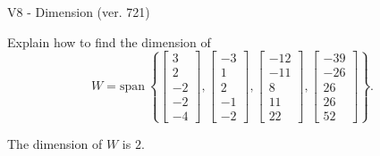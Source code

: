 \begin{exercise}
  \begin{exerciseTitle}V8 - Dimension (ver. 721)\end{exerciseTitle}
  \begin{exerciseStatement}
    Explain how to find the dimension of 
\[W=\mathrm{span}\ \left\{\left[\begin{array}{r}
3 \\
2 \\
-2 \\
-2 \\
-4
\end{array}\right] , \left[\begin{array}{r}
-3 \\
1 \\
2 \\
-1 \\
-2
\end{array}\right] , \left[\begin{array}{r}
-12 \\
-11 \\
8 \\
11 \\
22
\end{array}\right] , \left[\begin{array}{r}
-39 \\
-26 \\
26 \\
26 \\
52
\end{array}\right]\right\}.\]



  \end{exerciseStatement}
  \begin{exerciseAnswer}
   The dimension of \(W\) is  \(2\).
  


  \end{exerciseAnswer}
\end{exercise}